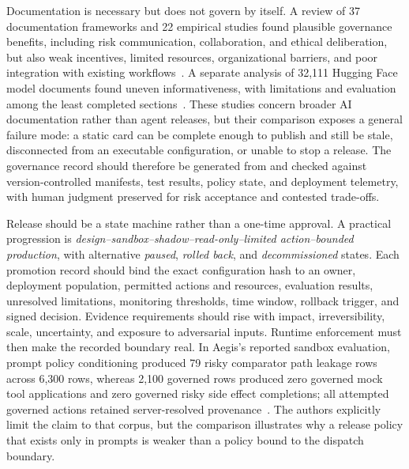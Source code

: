 Documentation is necessary but does not govern by itself. A review of 37 documentation frameworks and 22 empirical studies found plausible governance benefits, including risk communication, collaboration, and ethical deliberation, but also weak incentives, limited resources, organizational barriers, and poor integration with existing workflows~\cite{winecoff2024documentation}. A separate analysis of 32,111 Hugging Face model documents found uneven informativeness, with limitations and evaluation among the least completed sections~\cite{liang2024modelcards}. These studies concern broader AI documentation rather than agent releases, but their comparison exposes a general failure mode: a static card can be complete enough to publish and still be stale, disconnected from an executable configuration, or unable to stop a release. The governance record should therefore be generated from and checked against version-controlled manifests, test results, policy state, and deployment telemetry, with human judgment preserved for risk acceptance and contested trade-offs.

Release should be a state machine rather than a one-time approval. A practical progression is \emph{design--sandbox--shadow--read-only--limited action--bounded production}, with alternative \emph{paused}, \emph{rolled back}, and \emph{decommissioned} states. Each promotion record should bind the exact configuration hash to an owner, deployment population, permitted actions and resources, evaluation results, unresolved limitations, monitoring thresholds, time window, rollback trigger, and signed decision. Evidence requirements should rise with impact, irreversibility, scale, uncertainty, and exposure to adversarial inputs. Runtime enforcement must then make the recorded boundary real. In Aegis's reported sandbox evaluation, prompt policy conditioning produced 79 risky comparator path leakage rows across 6,300 rows, whereas 2,100 governed rows produced zero governed mock tool applications and zero governed risky side effect completions; all attempted governed actions retained server-resolved provenance~\cite{mazzocchetti2026aegis}. The authors explicitly limit the claim to that corpus, but the comparison illustrates why a release policy that exists only in prompts is weaker than a policy bound to the dispatch boundary.

